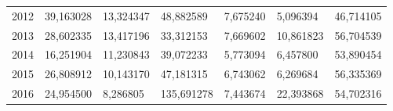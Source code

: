 \begin{table}
\begin{tabular}{p{1cm}p{2cm}p{2cm}p{2cm}p{2cm}p{2cm}p{2cm}}
 2012 &         39,163028 &                           13,324347 &            48,882589 &                       7,675240 &   5,096394 & 46,714105 \\
 2013 &         28,602335 &                           13,417196 &            33,312153 &                       7,669602 &  10,861823 & 56,704539 \\
 2014 &         16,251904 &                           11,230843 &            39,072233 &                       5,773094 &   6,457800 & 53,890454 \\
 2015 &         26,808912 &                           10,143170 &            47,181315 &                       6,743062 &   6,269684 & 56,335369 \\
 2016 &         24,954500 &                            8,286805 &           135,691278 &                       7,443674 &  22,393868 & 54,702316 \\
\bottomrule
\end{tabular}
\end{table}
